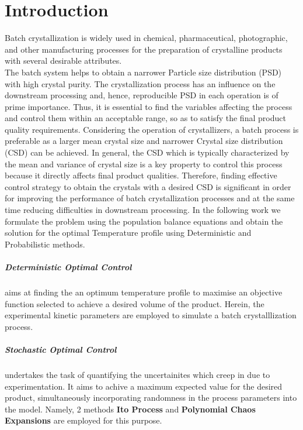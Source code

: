 \chapter{Introduction}
Batch crystallization is widely used in chemical, pharmaceutical, photographic, and other manufacturing processes for the preparation of crystalline products with several desirable attributes. \\
The batch system helps to obtain a narrower Particle size distribution (PSD) with high crystal purity. The crystallization process has an influence on the downstream processing and, hence, reproducible PSD in each operation is of prime importance. Thus, it is essential to find the variables affecting the process and control them within an acceptable range, so as to satisfy the final product quality requirements.
Considering the operation of crystallizers, a batch process is preferable as a larger mean crystal size and narrower Crystal size distribution (CSD) can be achieved. In general, the CSD which is typically characterized by the mean and variance of crystal size is a key property to control this process because it directly affects final product qualities. Therefore, finding effective control strategy to obtain the crystals with a desired CSD is significant in order for improving the performance of batch crystallization processes and at the same time reducing difficulties in downstream processing.
In the following work we formulate the problem using the population balance equations and obtain the solution for the optimal Temperature profile using Deterministic and Probabilistic methods. 

\paragraph{Deterministic Optimal Control} aims at finding the an optimum temperature profile to maximise an objective function selected to achieve a desired volume of the product. Herein, the experimental kinetic parameters are employed to simulate a batch crystalllization process.

\paragraph{Stochastic Optimal Control} undertakes the task of quantifying the uncertainites which creep in due to experimentation. It aims to achive a maximum expected value for the desired product, simultaneously incorporating  randomness in the process parameters into the model. Namely, 2 methods \textbf{Ito Process} and \textbf{Polynomial Chaos Expansions} are employed for this purpose.


